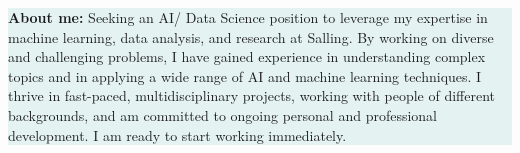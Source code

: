 \documentclass[a4paper,12pt]{article}
\begin{document}
\begin{center}
    \colorbox[HTML]{E4F2F2}
     {\begin{minipage}[c]{14cm}
      \textbf{\textcolor{blueSalling}{About me:}} Seeking an AI/ Data Science position to leverage my expertise in machine learning, data analysis, and research at Salling. By working on diverse and challenging problems, I have gained experience in understanding complex topics and in applying a wide range of AI and machine learning techniques. I thrive in fast-paced, multidisciplinary projects, working with people of different backgrounds, and am committed to ongoing personal and professional development. I am ready to start working immediately.

     \end{minipage}}
\end{center}
\end{document}
